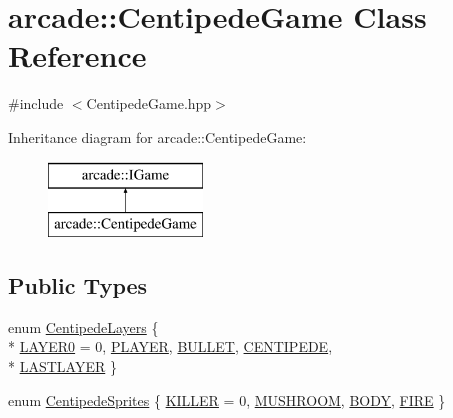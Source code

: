 \hypertarget{classarcade_1_1_centipede_game}{\section{arcade\-:\-:Centipede\-Game Class Reference}
\label{classarcade_1_1_centipede_game}
}


{\ttfamily \#include $<$Centipede\-Game.\-hpp$>$}

Inheritance diagram for arcade\-:\-:Centipede\-Game\-:\begin{figure}[H]
\begin{center}
\leavevmode
\includegraphics[height=2.000000cm]{classarcade_1_1_centipede_game}
\end{center}
\end{figure}
\subsection*{Public Types}
\begin{DoxyCompactItemize}
\item 
enum \hyperlink{classarcade_1_1_centipede_game_a8e150013dbaeb7bd9d9e5cb2cd3b8c8f}{Centipede\-Layers} \{ \\*
\hyperlink{classarcade_1_1_centipede_game_a8e150013dbaeb7bd9d9e5cb2cd3b8c8faca10410ec8102d60b32283df8d7dace9}{L\-A\-Y\-E\-R0} = 0, 
\hyperlink{classarcade_1_1_centipede_game_a8e150013dbaeb7bd9d9e5cb2cd3b8c8fa7d13720deac2c6e502be9d91ac3392f2}{P\-L\-A\-Y\-E\-R}, 
\hyperlink{classarcade_1_1_centipede_game_a8e150013dbaeb7bd9d9e5cb2cd3b8c8fa2bfe1247c94537aa74ce4c70a7b363fa}{B\-U\-L\-L\-E\-T}, 
\hyperlink{classarcade_1_1_centipede_game_a8e150013dbaeb7bd9d9e5cb2cd3b8c8fab8a9d80312c280dd9c27c9d0cf438ced}{C\-E\-N\-T\-I\-P\-E\-D\-E}, 
\\*
\hyperlink{classarcade_1_1_centipede_game_a8e150013dbaeb7bd9d9e5cb2cd3b8c8fa1d2a49c31d0b3918fd4810e04852510a}{L\-A\-S\-T\-L\-A\-Y\-E\-R}
 \}
\item 
enum \hyperlink{classarcade_1_1_centipede_game_aa78ea4d05806fef42a3ea01c50a88deb}{Centipede\-Sprites} \{ \hyperlink{classarcade_1_1_centipede_game_aa78ea4d05806fef42a3ea01c50a88deba1189697ac20bc79854e29761e3edaa51}{K\-I\-L\-L\-E\-R} = 0, 
\hyperlink{classarcade_1_1_centipede_game_aa78ea4d05806fef42a3ea01c50a88deba4dfc69722f3746fced8bbb615eb26e81}{M\-U\-S\-H\-R\-O\-O\-M}, 
\hyperlink{classarcade_1_1_centipede_game_aa78ea4d05806fef42a3ea01c50a88deba65e084ee4d8cdea1e9d04beae682319c}{B\-O\-D\-Y}, 
\hyperlink{classarcade_1_1_centipede_game_aa78ea4d05806fef42a3ea01c50a88debaa48cbd57f6e157a52d123a52dbaa533f}{F\-I\-R\-E}
 \}
\end{DoxyCompactItemize}
